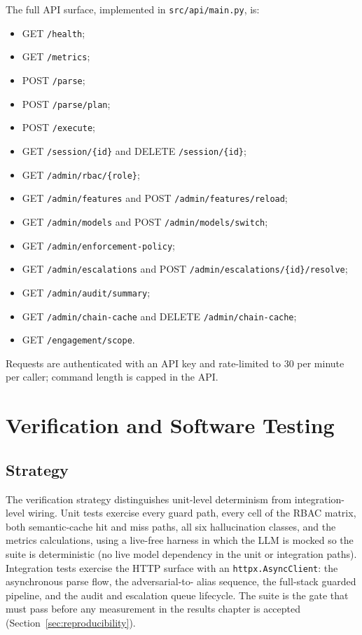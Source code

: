 The full API surface, implemented in \texttt{src/api/main.py}, is:
\begin{itemize}
\item GET \texttt{/health};
\item GET \texttt{/metrics};
\item POST \texttt{/parse};
\item POST \texttt{/parse/plan};
\item POST \texttt{/execute};
\item GET \texttt{/session/}\texttt{\{id\}} and DELETE \texttt{/session/}\texttt{\{id\}};
\item GET \texttt{/admin/rbac/}\texttt{\{role\}};
\item GET \texttt{/admin/features} and POST \texttt{/admin/features/reload};
\item GET \texttt{/admin/models} and POST \texttt{/admin/models/switch};
\item GET \texttt{/admin/enforcement-policy};
\item GET \texttt{/admin/escalations} and POST
\texttt{/admin/escalations/}\hspace{0pt}\texttt{\{id\}/}\hspace{0pt}\texttt{resolve};
\item GET \texttt{/admin/audit/summary};
\item GET \texttt{/admin/chain-cache} and DELETE \texttt{/admin/chain-cache};
\item GET \texttt{/engagement/scope}.
\end{itemize}
Requests are authenticated with an API key and rate-limited to 30 per minute
per caller; command length is capped in the API.


\section{Verification and Software Testing}\label{sec:testing}

\subsection*{Strategy}

The verification strategy distinguishes unit-level determinism from
integration-level wiring. Unit tests exercise every guard path, every cell of
the RBAC matrix, both semantic-cache hit and miss paths, all six hallucination
classes, and the metrics calculations, using a live-free harness in which the
LLM is mocked so the suite is deterministic (no live model dependency in the
unit or integration paths). Integration tests exercise the HTTP surface with
an \texttt{httpx.AsyncClient}: the asynchronous parse flow, the adversarial-to-
alias sequence, the full-stack guarded pipeline, and the audit and escalation
queue lifecycle. The suite is the gate that must pass before any measurement
in the results chapter is accepted (Section~\ref{sec:reproducibility}).

